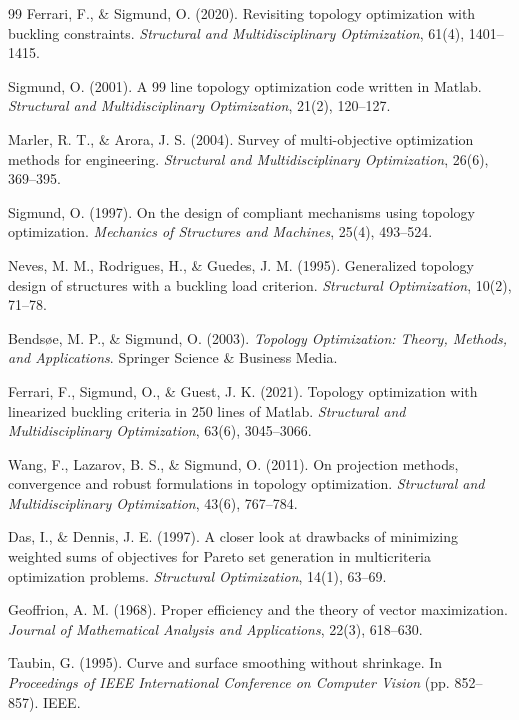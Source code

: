 \documentclass[11pt, a4paper]{article}
\begin{document}
\begin{thebibliography}{99}
Ferrari, F., \& Sigmund, O. (2020). Revisiting topology optimization with buckling constraints. \textit{Structural and Multidisciplinary Optimization}, 61(4), 1401--1415.

Sigmund, O. (2001). A 99 line topology optimization code written in Matlab. \textit{Structural and Multidisciplinary Optimization}, 21(2), 120--127.

Marler, R. T., \& Arora, J. S. (2004). Survey of multi-objective optimization methods for engineering. \textit{Structural and Multidisciplinary Optimization}, 26(6), 369--395.

Sigmund, O. (1997). On the design of compliant mechanisms using topology optimization. \textit{Mechanics of Structures and Machines}, 25(4), 493--524.

Neves, M. M., Rodrigues, H., \& Guedes, J. M. (1995). Generalized topology design of structures with a buckling load criterion. \textit{Structural Optimization}, 10(2), 71--78.

Bendsøe, M. P., \& Sigmund, O. (2003). \textit{Topology Optimization: Theory, Methods, and Applications}. Springer Science \& Business Media.

Ferrari, F., Sigmund, O., \& Guest, J. K. (2021). Topology optimization with linearized buckling criteria in 250 lines of Matlab. \textit{Structural and Multidisciplinary Optimization}, 63(6), 3045--3066.

Wang, F., Lazarov, B. S., \& Sigmund, O. (2011). On projection methods, convergence and robust formulations in topology optimization. \textit{Structural and Multidisciplinary Optimization}, 43(6), 767--784.

Das, I., \& Dennis, J. E. (1997). A closer look at drawbacks of minimizing weighted sums of objectives for Pareto set generation in multicriteria optimization problems. \textit{Structural Optimization}, 14(1), 63--69.

Geoffrion, A. M. (1968). Proper efficiency and the theory of vector maximization. \textit{Journal of Mathematical Analysis and Applications}, 22(3), 618--630.

Taubin, G. (1995). Curve and surface smoothing without shrinkage. In \textit{Proceedings of IEEE International Conference on Computer Vision} (pp. 852--857). IEEE.
\end{thebibliography}
\end{document}
